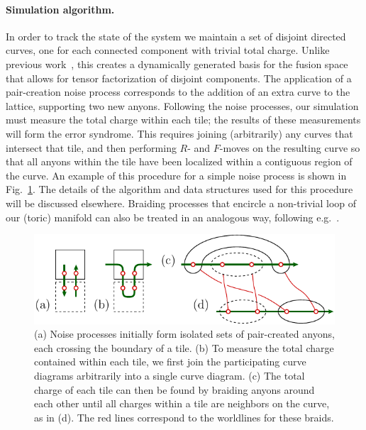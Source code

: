\documentclass[aps, prl, letterpaper, twocolumn, superscriptaddress, notitlepage, 10pt]{revtex4-1}
\newcommand{\Fref}[1]{Fig.~\ref{#1}}
\begin{document}
\paragraph{Simulation algorithm.}

In order to track the state of the system we maintain 
a set of disjoint directed curves, 
one for each connected component with trivial total charge.
Unlike previous work~\cite{Brell2013}, this creates a dynamically generated basis for the fusion space 
that allows for tensor factorization of disjoint components.
The application of a pair-creation noise process corresponds to the 
addition of an extra curve to the lattice, supporting
two new anyons.
Following the noise processes, our simulation must 
measure the total charge within each tile; the results of 
these measurements will form the error syndrome. 
This requires joining (arbitrarily) any curves that intersect that tile, 
and then performing $R$- and $F$-moves on the resulting
curve so that 
all anyons within the tile have been 
localized within a contiguous region of the curve. 
An example of this 
procedure for a simple noise process is shown in \Fref{f:syndrome}.
The details of the algorithm and data structures used for 
this procedure will be discussed elsewhere.
Braiding processes that encircle 
a non-trivial loop of our (toric) manifold can also be 
treated in an analogous way, following e.g.~\cite{Pfeifer2012}.

\begin{figure}[t!]
\begin{center}
	\includegraphics[width=1.0\columnwidth]{pic-syndrome.pdf}
\caption{
(a) Noise processes initially form isolated sets of pair-created anyons, 
each crossing the boundary of a tile. 
(b) To measure the total charge 
contained within each tile, 
we first join the participating curve 
diagrams arbitrarily into a single curve diagram.
(c) The total charge of each tile can then be found 
by braiding anyons around each other until all charges within 
a tile are neighbors on the curve, as in (d).  
The red lines correspond to the worldlines for these braids.
}
\label{f:syndrome}
\end{center}
\vspace{-10pt}
\end{figure}
\end{document}
